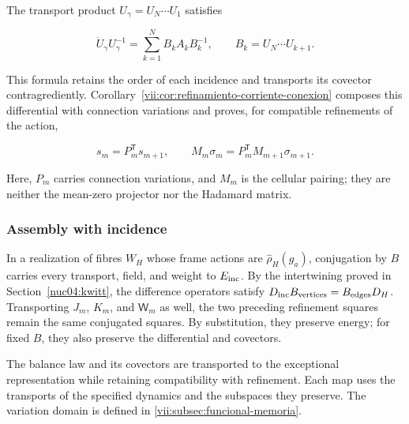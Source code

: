The transport product \(U_\gamma=U_N\cdots U_1\) satisfies

\[
\dot U_\gamma U_\gamma^{-1}
=\sum_{k=1}^N B_kA_kB_k^{-1},\qquad B_k=U_N\cdots U_{k+1}.
\]

This formula retains the order of each incidence and transports its covector contragrediently. Corollary~\ref{vii:cor:refinamiento-corriente-conexion} composes this differential with connection variations and proves, for compatible refinements of the action,

\[
s_m=P_m^{\mathsf T}s_{m+1},\qquad
M_m\sigma_m=P_m^{\mathsf T}M_{m+1}\sigma_{m+1}.
\]

Here, \(P_m\) carries connection variations, and \(M_m\) is the cellular pairing; they are neither the mean-zero projector nor the Hadamard matrix.

\subsubsection{Assembly with incidence}

In a realization of fibres \(W_H\) whose frame actions are \(\widehat\rho_H(g_a)\), conjugation by \(B\) carries every transport, field, and weight to \(E_{\rm inc}\). By the intertwining proved in Section~\ref{nuc04:kwitt}, the difference operators satisfy \(D_{\rm inc}B_{\rm vertices}=B_{\rm edges}D_H\). Transporting \(J_m\), \(K_m\), and \(\mathsf W_m\) as well, the two preceding refinement squares remain the same conjugated squares. By substitution, they preserve energy; for fixed \(B\), they also preserve the differential and covectors.

The balance law and its covectors are transported to the exceptional representation while retaining compatibility with refinement. Each map uses the transports of the specified dynamics and the subspaces they preserve. The variation domain is defined in \cref{vii:subsec:funcional-memoria}.
